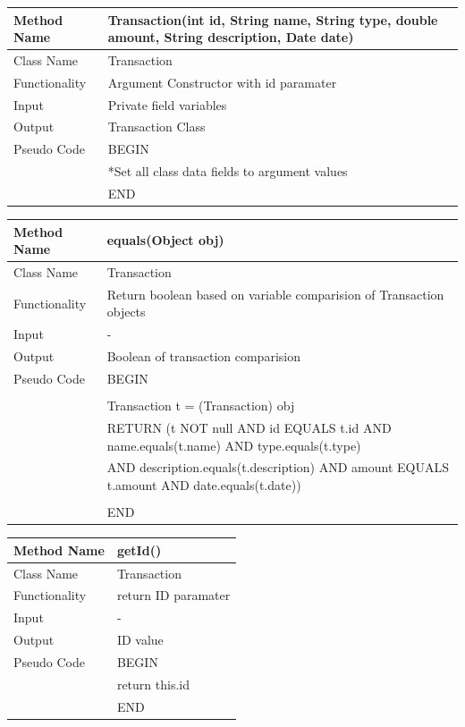 \documentclass[12pt]{article}
\begin{document}
\begin{tabular}{ |p{3cm}||p{\colWidth}|  }
	\hline
	Method Name & Transaction(int id, String name, String type, double amount, String description, Date date)\\
	\hline
	Class Name & Transaction\\
	\hline
	Functionality & Argument Constructor with id paramater\\
	\hline
	Input & Private field variables\\
	\hline
	Output & Transaction Class\\
	\hline
	Pseudo Code & BEGIN \\
	& *Set all class data fields to argument values\\
	& END \\
	\hline
\end{tabular}



\begin{tabular}{ |p{3cm}||p{\colWidth}|  }
	\hline
	Method Name &  equals(Object obj) \\
	\hline
	Class Name & Transaction\\
	\hline
	Functionality &  Return boolean based on variable comparision of Transaction objects\\
	\hline
	Input & - \\
	\hline
	Output & Boolean of transaction comparision\\
	\hline
	Pseudo Code & 	BEGIN \\
	& \\
	& Transaction t = (Transaction) obj \\
	& RETURN (t NOT null AND id EQUALS t.id AND name.equals(t.name) AND type.equals(t.type) \\
	& AND description.equals(t.description) AND amount EQUALS t.amount AND date.equals(t.date))\\
	& \\
	& END \\
	\hline
\end{tabular}



\begin{tabular}{ |p{3cm}||p{\colWidth}|  }
	\hline
	Method Name &  getId() \\
	\hline
	Class Name & Transaction\\
	\hline
	Functionality & return ID paramater\\
	\hline
	Input & -\\
	\hline
	Output & ID value\\
	\hline
	Pseudo Code& BEGIN \\
	& return this.id\\
	&END\\
	\hline
\end{tabular}
\end{document}
